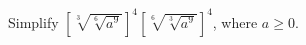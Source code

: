 Simplify $\left[\sqrt[3]{\sqrt[6]{a^9}}\right]^4\left[\sqrt[6]{\sqrt[3]{a^9}}\right]^4$, where $a\ge0$.
